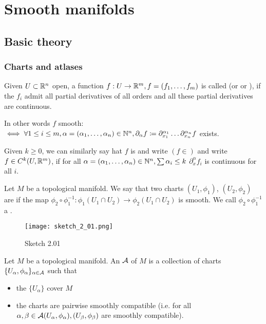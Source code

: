 \chapter{Smooth manifolds}
\section{Basic theory}
\subsection{Charts and atlases}
\begin{definition*}
    Given \(U\subset\mathbb{R}^n\) open, a function \(f:U\to \mathbb{R}^m, f=(f_1,\dots,f_m)\) is called 
     (or \dhighlight{\(\C^\infty\)} or ), if the 
     \(f_i\) admit all partial derivatives of all orders and all these partial derivatives are continuous.
\end{definition*}
In other words \(f\) smooth: \(\iff\forall 1\leq i\leq m,\alpha=(\alpha_1,\dots,\alpha_n)\in\mathbb{N}^n,\partial_{\alpha} f\coloneqq \partial_{x_1}^{\alpha_1} \dots \partial_{x_n}^{\alpha_n} f\) exists.

\begin{remark}
    Given \(k\geq 0\), we can similarly say hat \(f\) is  and write \((f\in)\) and write \(f\in C^k(U,\mathbb{R}^m)\), if 
    for all \(\alpha=(\alpha_1,\dots,\alpha_n)\in\mathbb{N}^n,\sum\alpha_i \leq k\) \(\partial_x^\alpha f_i\) is continuous for all \(i\).
\end{remark}

\begin{definition*}
    Let \(M\) be a topological manifold. We say that two charts \((U_1,\phi_1)\), \((U_2,\phi_2)\)
    are  if the map \(\phi_2\circ \phi_1^{-1}:\phi_1(U_1\cap U_2)\to\phi_2(U_1\cap U_2)\)
    is smooth. We call \(\phi_2\circ\phi_1^{-1}\) a .
    \begin{figure}[H]
        \centering
        \texttt{[image: sketch\_2\_01.png]}
        \caption{Sketch 2.01}
    \end{figure}
\end{definition*}

\begin{definition*}
    Let \(M\) be a topological manifold. An  \(\mathcal{A}\) of \(M\) is a collection of charts 
    \(\{U_\alpha,\phi_\alpha\}_{\alpha\in\mathcal{A}}\) such that 
    \begin{itemize}
        \item the \(\{U_\alpha\}\) cover \(M\)
        \item the charts are pairwise smoothly compatible (i.e. for all \(\alpha,\beta\in\mathcal{A} (U_\alpha,\phi_\alpha),(U_\beta,\phi_\beta)\) are smoothly compatible).
    \end{itemize}
\end{definition*}

